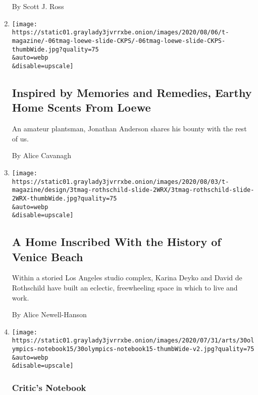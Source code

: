 \begin{enumerate}
  By Scott J. Ross
\item
  \href{/2020/08/06/t-magazine/loewe-home-scents-candles.html}{}

  \texttt{[image: https://static01.graylady3jvrrxbe.onion/images/2020/08/06/t-magazine/-06tmag-loewe-slide-CKPS/-06tmag-loewe-slide-CKPS-thumbWide.jpg?quality=75\\\&auto=webp\\\&disable=upscale]}

  \hypertarget{inspired-by-memories-and-remedies-earthy-home-scents-from-loewe}{%
  \subsection{Inspired by Memories and Remedies, Earthy Home Scents From
  Loewe}\label{inspired-by-memories-and-remedies-earthy-home-scents-from-loewe}}

  An amateur plantsman, Jonathan Anderson shares his bounty with the
  rest of us.

  By Alice Cavanagh
\item
  \href{/2020/08/03/t-magazine/david-de-rothschild-venice-home-design.html}{}

  \texttt{[image: https://static01.graylady3jvrrxbe.onion/images/2020/08/03/t-magazine/design/3tmag-rothschild-slide-2WRX/3tmag-rothschild-slide-2WRX-thumbWide.jpg?quality=75\\\&auto=webp\\\&disable=upscale]}

  \hypertarget{a-home-inscribed-with-the-history-of-venice-beach}{%
  \subsection{A Home Inscribed With the History of Venice
  Beach}\label{a-home-inscribed-with-the-history-of-venice-beach}}

  Within a storied Los Angeles studio complex, Karina Deyko and David de
  Rothschild have built an eclectic, freewheeling space in which to live
  and work.

  By Alice Newell-Hanson
\item
  \href{/2020/07/30/arts/design/tokyo-olympics-1964-design.html}{}

  \texttt{[image: https://static01.graylady3jvrrxbe.onion/images/2020/07/31/arts/30olympics-notebook15/30olympics-notebook15-thumbWide-v2.jpg?quality=75\\\&auto=webp\\\&disable=upscale]}

  \hypertarget{critics-notebook}{%
  \subsubsection{Critic's Notebook}\label{critics-notebook}}


\end{enumerate}
